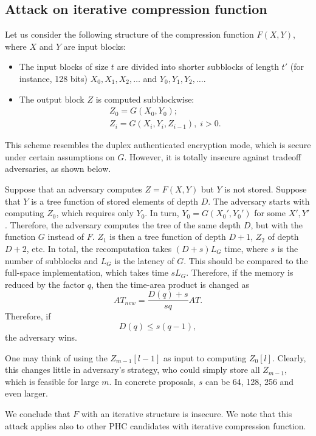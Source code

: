 \documentclass[a4paper]{article}
\begin{document}
\subsection{Attack on iterative compression function}\label{sec:att-iter}

Let us consider the following structure of the compression function $F(X,Y)$, where $X$ and $Y$ are input blocks:
\begin{itemize}
  \item The input blocks of size $t$ are divided into shorter subblocks of length $t'$ (for instance, 128 bits) $X_0,X_1,X_2,\ldots$ and $Y_0,Y_1,Y_2,\ldots$.
  \item The output block $Z$ is computed subblockwise:
  \begin{align*}
    Z_0 = G(X_0,Y_0);\\
    Z_i = G(X_i,Y_i,Z_{i-1}),\;i>0.
  \end{align*}
\end{itemize}
This scheme resembles the duplex authenticated encryption mode, which is secure under certain assumptions on $G$. However, it is totally insecure against tradeoff adversaries, as shown below.

Suppose that an adversary computes $Z = F(X,Y)$ but $Y$ is not stored. Suppose that  $Y$ is a tree function of stored elements of depth $D$.  The adversary starts with computing $Z_0$, which requires only $Y_0$. In turn, $Y_0 = G(X_0', Y_0')$ for some $X',Y'$.
Therefore, the adversary computes the tree of the same depth $D$, but with the function $G$ instead of $F$. $Z_1$ is then a tree function of depth $D+1$, $Z_2$ of depth $D+2$, etc. In total, the recomputation takes $(D+s)L_G$ time, where $s$ is the number of subblocks and $L_G$ is the latency of $G$. This should be compared to the full-space implementation, which takes time
$sL_G$. Therefore, if the memory is reduced by the factor $q$, then the time-area product is changed as
$$
AT_{new} = \frac{D(q)+s}{sq}AT.
$$
Therefore, if
\begin{equation}\label{att:iter}
D(q) \leq s(q-1),
\end{equation}
the adversary wins.

One may think of using the $Z_{m-1}[l-1]$ as input to computing $Z_0[l]$. Clearly, this changes little in adversary's strategy, who could simply store all $Z_{m-1}$, which is feasible for large $m$. In concrete proposals, $s$ can be 64, 128, 256 and even larger.

We conclude that $F$ with an iterative structure is insecure. We note that this attack applies also to other PHC candidates with iterative compression function.
\end{document}
